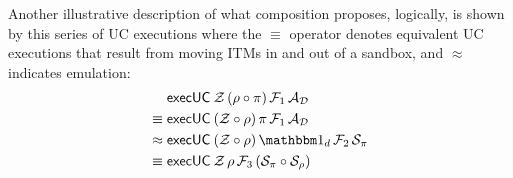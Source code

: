 Another illustrative description of what composition proposes, logically, is shown by this series of UC executions where the $\equiv$ operator denotes equivalent UC executions that result from moving ITMs in and out of a sandbox, and $\approx$ indicates emulation:
\begin{align}
& \msf{execUC} \: \Z \, (\rho \circ \pi) \, \F_1 \, \DA \\
\equiv \; & \msf{execUC} \: (\Z \circ \rho) \, \pi \, \F_1 \, \DA \\
\approx \; & \msf{execUC} \: (\Z \circ \rho) \, \idealP \, \F_2 \, \SIM{\pi} \\
\equiv \; & \msf{execUC} \: \Z \, \rho \, \F_3 \, (\SIM{\pi} \circ \SIM{\rho})
\end{align}



